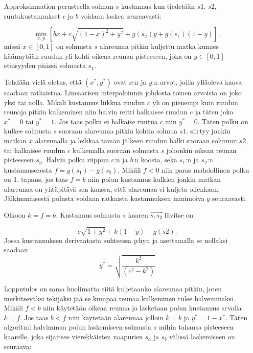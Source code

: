 \documentclass[finnish]{tktltiki2}
\theoremstyle{definition}
\theoremstyle{remark}
\begin{document}
Approksimaation perusteella solmun \(s\) kustannus kun tiedetään \(s1\), \(s2\), ruutukustannukset \(c\) ja \(b\) voidaan laskea seuraavasti:

\[\min_{x,y}[bx+c\sqrt{(1-x)^2+y^2}+g(s_2)y+g(s_1)(1-y)],\]
missä $x \in [0,1]$ on solmusta $s$ alareunaa pitkin kuljettu matka kunnes käännytään ruudun yli kohti oikeaa reunaa pisteeseen, joka on $y \in [0,1]$ etäisyyden päässä solmusta $s_1$.

Tehdään vielä oletus, että \((x^*, y^*)\) ovat \(x\):n ja \(y\):n arvot, joilla ylläoleva kaava saadaan ratkaistua. Lineaarisen interpoloinnin johdosta toinen arvoista on joko yksi tai nolla. Mikäli kustannus liikkua ruudun \(c\) yli on pienempi kuin ruudun reunoja pitkin kulkeminen niin halvin reitti halkaisee ruudun \(c\) ja täten joko \(x^* = 0\) tai \(y^* = 1\). Jos taas polku ei halkaise ruutua \(c\) niin \(y^* = 0\). Täten polku on kulkee solmusta \(s\) suoraan alareunaa pitkin kohtia solmua \(s1\), siirtyy jonkin matkan \(x\) alareunalla ja leikkaa tämän jälkeen ruudun halki suoraan solmuun \(s2\), tai halkaisee ruudun \(c\) kulkemalla suoraan solmusta \(s\) johonkin oikean reunan pisteeseen \(s_y\). Halvin polku riippuu \(c\):n ja \(b\):n koosta, sekä \(s_1\):n ja \(s_2\):n kustannuserosta \(f = g(s_1) - g(s_2)\). Mikäli \(f < 0\) niin paras mahdollinen polku on 1. tapaus, jos taas \(f = b\) niin polun kustannus kulkien jonkin matkan alareunaa on yhtäpitävä sen kanssa, että alareunaa ei kuljeta ollenkaan. Jälkimmäisestä polusta voidaan ratkaista kustannuksen minimoiva \(y\) seuraavasti.

Olkoon $k = f = b$. Kustannus solmusta $s$ kaaren $\overrightarrow{s_1s_2}$ lävitse on

\[c\sqrt{1+y^2}+k(1-y)+g(s2).\]
Jossa kustannuksen derivaatasta suhteessa \(y\):hyn ja asettamalla se nollaksi saadaan
\[y^* = \sqrt{\frac{k^2}{(c^2-k^2)}}\]

Lopputulos on sama huolimatta siitä kuljetaanko alareunaa pitkin, joten merkitseväksi tekijäksi jää se kumpaa reunaa kulkeminen tulee halvemmaksi. Mikäli \(f < b\) niin käytetään oikeaa reunaa ja lasketaan polun kustannus arvolla \(k = f\). Jos taas \(b < f\) niin käytetään alareunaa jolloin \(k = b\) ja \(y^* = 1 - x^*\). Täten algoritmi halvimman polun laskemiseen solmusta \(s\) mihin tahansa pisteeseen kaarelle, joka sijaitsee vierekkäisten naapurien \(s_a\) ja \(s_b\) välissä laskemiseen on seuraava:
\end{document}
